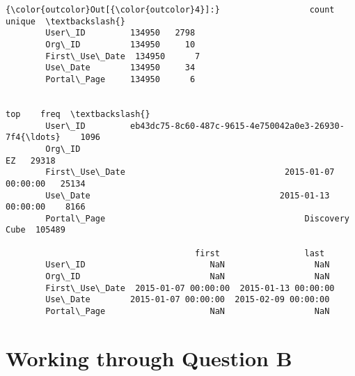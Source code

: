 \documentclass[11pt]{article}
\begin{document}
\begin{Verbatim}[commandchars=\\\{\}]
{\color{outcolor}Out[{\color{outcolor}4}]:}                  count unique  \textbackslash{}
        User\_ID         134950   2798   
        Org\_ID          134950     10   
        First\_Use\_Date  134950      7   
        Use\_Date        134950     34   
        Portal\_Page     134950      6   
        
                                                                      top    freq  \textbackslash{}
        User\_ID         eb43dc75-8c60-487c-9615-4e750042a0e3-26930-7f4{\ldots}    1096   
        Org\_ID                                                         EZ   29318   
        First\_Use\_Date                                2015-01-07 00:00:00   25134   
        Use\_Date                                      2015-01-13 00:00:00    8166   
        Portal\_Page                                        Discovery Cube  105489   
        
                                      first                 last  
        User\_ID                         NaN                  NaN  
        Org\_ID                          NaN                  NaN  
        First\_Use\_Date  2015-01-07 00:00:00  2015-01-13 00:00:00  
        Use\_Date        2015-01-07 00:00:00  2015-02-09 00:00:00  
        Portal\_Page                     NaN                  NaN  
\end{Verbatim}
            
    \hypertarget{working-through-question-b}{%
\section{Working through Question B}\label{working-through-question-b}}
\end{document}
